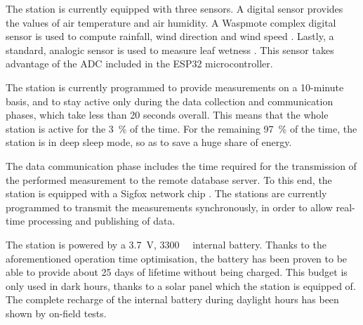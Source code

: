 \documentclass[conference]{IEEEtran}
\begin{document}
The station is currently equipped with three sensors. 
A digital sensor provides the values of air temperature and air humidity. %
A Waspmote complex digital sensor is used to compute rainfall, wind direction and wind speed \cite{libellium:ws3000}.
Lastly, a standard, analogic sensor is used to measure leaf wetness \cite{vaisala:yl83-leaf-wetness}.
This sensor takes advantage of the ADC included in the ESP32 microcontroller.


The station is currently programmed to provide measurements on a 10-minute basis, and to stay active only during the data collection and communication phases, which take less than 20 seconds overall. This means that the whole station is active for the \SI{3}{\%} of the time.
For the remaining \SI{97}{\%} of the time, the station is in deep sleep mode, so as to save a huge share of energy. %

The data communication phase includes the time required for the transmission of the performed measurement to the remote database server.
To this end, the station is equipped with a Sigfox network chip \cite{sigfox:module}.
The stations are currently programmed to transmit the measurements synchronously, in order to allow real-time processing and publishing of data.

The station is powered by a \SI{3.7}{\volt}, \SI{3300}{\milli\amperehour} internal battery.
Thanks to the aforementioned operation time optimisation, the battery has been proven to be able to provide about 25 days of lifetime without being charged.
This budget is only used in dark hours, thanks to a solar panel which the station is equipped of. 
The complete recharge of the internal battery %
during daylight hours has been shown by on-field tests.
\end{document}
